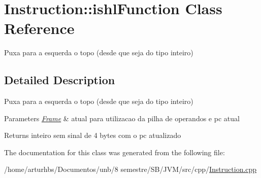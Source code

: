 \hypertarget{classInstruction_1_1ishlFunction}{}\section{Instruction\+:\+:ishl\+Function Class Reference}
\label{classInstruction_1_1ishlFunction}


Puxa para a esquerda o topo (desde que seja do tipo inteiro)  




\subsection{Detailed Description}
Puxa para a esquerda o topo (desde que seja do tipo inteiro) 


\begin{DoxyParams}{Parameters}
{\em \hyperlink{classFrame}{Frame}} & atual para utilizacao da pilha de operandos e pc atual \\
\hline
\end{DoxyParams}
\begin{DoxyReturn}{Returns}
inteiro sem sinal de 4 bytes com o pc atualizado 
\end{DoxyReturn}


The documentation for this class was generated from the following file\+:\begin{DoxyCompactItemize}
\item 
/home/arturhbs/\+Documentos/unb/8 semestre/\+S\+B/\+J\+V\+M/src/cpp/\hyperlink{Instruction_8cpp}{Instruction.\+cpp}\end{DoxyCompactItemize}
